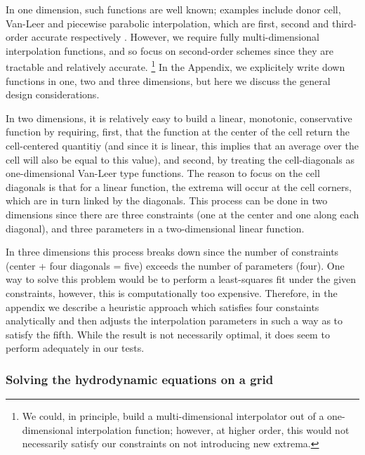 In one dimension, such functions are well known; examples include
donor cell, Van-Leer and piecewise parabolic interpolation, which are
first, second and third-order accurate respectively
\citep[e.g.,][]{Stone92a}.  However, we require fully
multi-dimensional interpolation functions, and so focus on
second-order schemes since they are tractable and relatively accurate.
\footnote{We could, in principle, build a multi-dimensional
  interpolator out of a one-dimensional interpolation function;
  however, at higher order, this would not necessarily satisfy our
  constraints on not introducing new extrema.}  In the Appendix, we
explicitely write down functions in one, two and three dimensions, but
here we discuss the general design considerations.

In two dimensions, it is relatively easy to build a linear, monotonic,
conservative function by requiring, first, that the function at the
center of the cell return the cell-centered quantitiy (and since it is
linear, this implies that an average over the cell will also be equal
to this value), and second, by treating the cell-diagonals as
one-dimensional Van-Leer type functions.  The reason to focus on the
cell diagonals is that for a linear function, the extrema will occur at the cell 
corners, which are in turn linked by the diagonals.  This process can be done in
two dimensions since there are three constraints (one at the center and one along
each diagonal), and three parameters in a two-dimensional linear
function.

In three dimensions this process breaks down since the number of
constraints (center + four diagonals = five) exceeds the number of
parameters (four).  One way to solve this problem would be to perform
a least-squares fit under the given constraints, however, this is
computationally too expensive.  Therefore, in the appendix we describe
a heuristic approach which satisfies four constaints analytically and
then adjusts the interpolation parameters in such a way as to satisfy the fifth.
While the result is not necessarily optimal, it does seem to perform
adequately in our tests.


\subsubsection{Solving the hydrodynamic equations on a grid}
\label{sec:solve_hydro}

